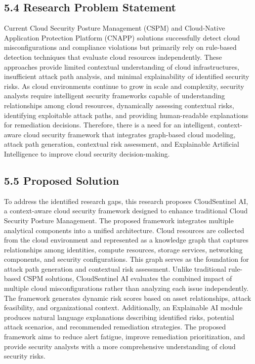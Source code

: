 \subsection{5.4 Research Problem Statement}

Current Cloud Security Posture Management (CSPM) and Cloud-Native Application Protection Platform (CNAPP) solutions successfully detect cloud misconfigurations and compliance violations but primarily rely on rule-based detection techniques that evaluate cloud resources independently. These approaches provide limited contextual understanding of cloud infrastructures, insufficient attack path analysis, and minimal explainability of identified security risks. As cloud environments continue to grow in scale and complexity, security analysts require intelligent security frameworks capable of understanding relationships among cloud resources, dynamically assessing contextual risks, identifying exploitable attack paths, and providing human-readable explanations for remediation decisions. Therefore, there is a need for an intelligent, context-aware cloud security framework that integrates graph-based cloud modeling, attack path generation, contextual risk assessment, and Explainable Artificial Intelligence to improve cloud security decision-making.

\subsection{5.5 Proposed Solution}

To address the identified research gaps, this research proposes CloudSentinel AI, a context-aware cloud security framework designed to enhance traditional Cloud Security Posture Management. The proposed framework integrates multiple analytical components into a unified architecture. Cloud resources are collected from the cloud environment and represented as a knowledge graph that captures relationships among identities, compute resources, storage services, networking components, and security configurations. This graph serves as the foundation for attack path generation and contextual risk assessment. Unlike traditional rule-based CSPM solutions, CloudSentinel AI evaluates the combined impact of multiple cloud misconfigurations rather than analyzing each issue independently. The framework generates dynamic risk scores based on asset relationships, attack feasibility, and organizational context. Additionally, an Explainable AI module produces natural language explanations describing identified risks, potential attack scenarios, and recommended remediation strategies. The proposed framework aims to reduce alert fatigue, improve remediation prioritization, and provide security analysts with a more comprehensive understanding of cloud security risks.

